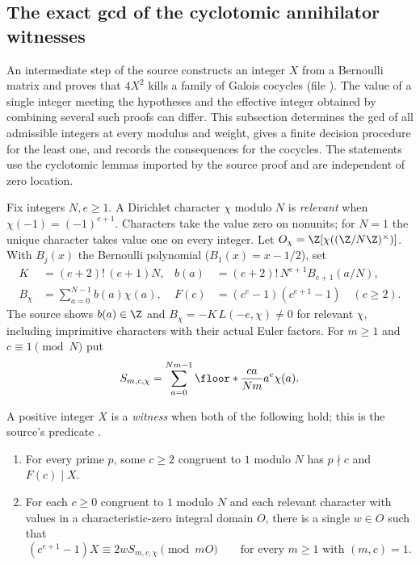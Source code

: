 \subsection{The exact gcd of the cyclotomic annihilator witnesses}\label{spn:sec:annihilator}

An intermediate step of the source constructs an integer $X$ from a Bernoulli
matrix and proves that $4X^2$ kills a family of Galois cocycles (file
). The value of a single integer meeting
the hypotheses and the effective integer obtained by combining several such
proofs can differ. This subsection determines the gcd of all admissible
integers at every modulus and weight, gives a finite decision procedure for
the least one, and records the consequences for the cocycles. The statements
use the cyclotomic lemmas imported by the source proof and are independent of
zero location.

Fix integers $N,e\ge1$. A Dirichlet character $\chi$ modulo $N$ is
\emph{relevant} when $\chi(-1)=(-1)^{e+1}$. Characters take the value zero on
nonunits; for $N=1$ the unique character takes value one on every integer.
Let $O_\chi=\Z[\chi((\Z/N\Z)^\times)]$. With $B_j(x)$ the Bernoulli
polynomial ($B_1(x)=x-1/2$), set
\begin{align*}
 K&=(e+2)!\,(e+1)N,& b(a)&=(e+2)!\,N^{e+1}B_{e+1}(a/N),\\
 B_\chi&=\sum_{a=0}^{N-1}b(a)\chi(a),& F(c)&=(c^e-1)(c^{e+1}-1)\quad(c\ge2).
\end{align*}
The source shows $b(a)\in\Z$ and $B_\chi=-K\,L(-e,\chi)\ne0$ for relevant
$\chi$, including imprimitive characters with their actual Euler factors.
For $m\ge1$ and $c\equiv1\pmod N$ put
\[
 S_{m,c,\chi}=\sum_{a=0}^{Nm-1}\floor*{\frac{ca}{Nm}}a^e\chi(a).
\]

\begin{definition}\label{spn:def:witness}
A positive integer $X$ is a \emph{witness} when both of the following hold;
this is the source's predicate .
\begin{enumerate}
\item For every prime $p$, some $c\ge2$ congruent to $1$ modulo $N$ has
$p\nmid c$ and $F(c)\mid X$.
\item For each $c\ge0$ congruent to $1$ modulo $N$ and each relevant
character with values in a characteristic-zero integral domain $O$, there is
a single $w\in O$ such that
\begin{equation}\label{spn:eq:stick}
 (c^{e+1}-1)X\equiv2wS_{m,c,\chi}\pmod{mO}
 \qquad\text{for every }m\ge1\text{ with }(m,c)=1 .
\end{equation}
\end{enumerate}
\end{definition}

